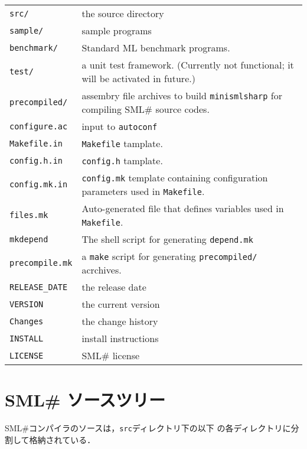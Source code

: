 \documentclass{jbook}
\newif\ifjp
\newcommand{\txt}[2]{#1}
\newcommand{\smlsharp}{SML\#}
\newcommand{\code}[1]{\mbox{\large\tt #1}}
\begin{document}
\begin{tabular}{ll}
\code{src/} & the source directory
\\
\code{sample/} & sample programs
\\
\code{benchmark/} & Standard ML benchmark programs.
\\
\code{test/} & a unit test framework. (Currently not functional; it will
be activated in future.)
\\
\code{precompiled/} & assembry file archives to build
\code{minismlsharp} for compiling \smlsharp{} source codes.
\\
\code{configure.ac} & input to \code{autoconf}
\\
\code{Makefile.in} & \code{Makefile} tamplate.
\\
\code{config.h.in} & \code{config.h} tamplate.
\\
\code{config.mk.in} &
	\code{config.mk} template containing configuration parameters used in \code{Makefile}.
\\
\code{files.mk} & Auto-generated file that defines variables used in
\code{Makefile}.
\\
\code{mkdepend} & The shell script for generating \code{depend.mk}
\\
\code{precompile.mk} & a \code{make} script for generating
    \code{precompiled/} acrchives.
\\
\code{RELEASE\_DATE} & the release date
\\
\code{VERSION} &  the current version
\\
\code{Changes} &  the change history
\\
\code{INSTALL} & install instructions
\\
\code{LICENSE} & \smlsharp{} license
\end{tabular}
\fi%

\section{\txt
{\smlsharp{} ソースツリー}
{The \smlsharp{} Source Tree}
}

\ifjp%
	\smlsharp{}コンパイラのソースは，\code{src}ディレクトリ下の以下
の各ディレクトリに分割して格納されている．
\end{document}
